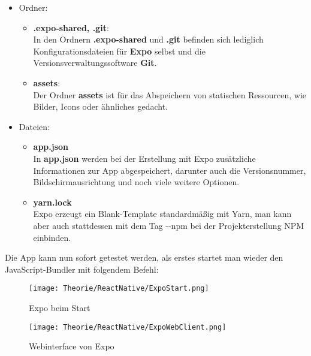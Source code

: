 \begin{itemize}
\item Ordner:
  \begin{itemize}
  \item \textbf{.expo-shared, .git}:\\
  In den Ordnern \textbf{.expo-shared} und \textbf{.git} befinden sich lediglich Konfigurationsdateien für
  \textbf{Expo} selbst und die Versionsverwaltungssoftware \textbf{Git}.

  \item \textbf{assets}:\\
  Der Ordner \textbf{assets} ist für das Abspeichern von statischen Ressourcen, wie Bilder, Icons oder
  ähnliches gedacht.
  \end{itemize}

\newpage

\item Dateien:
  \begin{itemize}
  \item \textbf{app.json}\\
  In \textbf{app.json} werden bei der Erstellung mit Expo zusätzliche Informationen zur App abgespeichert,
  darunter auch die Versionsnummer, Bildschirmausrichtung und noch viele weitere Optionen.

  \item \textbf{yarn.lock}\\
  Expo erzeugt ein Blank-Template standardmäßig mit Yarn, man kann aber auch stattdessen mit dem
  Tag -{}-npm bei der Projekterstellung NPM einbinden.
  \end{itemize}
\end{itemize}

Die App kann nun sofort getestet werden, als erstes startet man wieder den JavaScript-Bundler
\underline{} mit folgendem Befehl:

\begin{figure}[H]
  \begin{center}
    \texttt{[image: Theorie/ReactNative/ExpoStart.png]}
    \caption{Expo beim Start}
  \end{center}
\end{figure}

\begin{figure}[H]
  \begin{center}
    \texttt{[image: Theorie/ReactNative/ExpoWebClient.png]}
    \caption{Webinterface von Expo}
  \end{center}
\end{figure}

